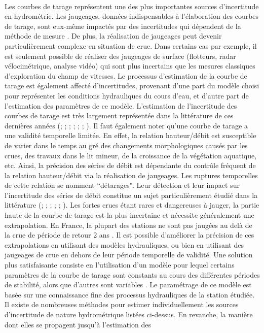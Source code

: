 \documentclass[11pt]{article}
\begin{document}
	\paragraph{} Les courbes de tarage représentent une des plus importantes sources d'incertitude en hydrométrie. Les jaugeages, données indispensables à l'élaboration des courbes de tarage, sont eux-même impactés par des incertitudes qui dépendent de la méthode de mesure \citep{lecoz_quantification_2014}. De plus, la réalisation de jaugeages peut devenir particulièrement complexe en situation de crue. Dans certains cas par exemple, il est seulement possible de réaliser des jaugeages de surface (flotteurs, radar vélocimétrique, analyse vidéo) qui sont plus incertains que les mesures classiques d'exploration du champ de vitesses. Le processus d'estimation de la courbe de tarage est également affecté d'incertitudes, provenant d'une part du modèle choisi pour représenter les conditions hydrauliques du cours d'eau, et d'autre part de l'estimation des paramètres de ce modèle. L'estimation de l'incertitude des courbes de tarage est très largement représentée dans la littérature de ces dernières années (\citet{petersen-overleir_bayesian_2009}; \citet{juston_rating_2014}; \citet{le_coz_combining_2014}; \citet{morlot_dynamic_2014}; \citet{coxon_novel_2015}; \citet{mcmillan_rating_2015}; \citet{mansanarez_rapid_2019}). Il faut également noter qu'une courbe de tarage a une validité temporelle limitée. En effet, la relation hauteur/débit est susceptible de varier dans le temps au gré des changements morphologiques causés par les crues, des travaux dans le lit mineur, de la croissance de la végétation aquatique, etc. Ainsi, la précision des séries de débit est dépendante du contrôle fréquent de la relation hauteur/débit via la réalisation de jaugeages. Les ruptures temporelles de cette relation se nomment ``détarages". Leur détection et leur impact sur l'incertitude des séries de débit constitue un sujet particulièrement étudié dans la littérature (\citet{mcmillan_impacts_2010}; \citet{westerberg_stage-discharge_2011}; \citet{guerrero_temporal_2012}; \citet{morlot_dynamic_2014}; \citet{lapuszek_methods_2015};  \citet{darienzo_detection_2021}). Les fortes crues étant rares et dangereuses à jauger, la partie haute de la courbe de tarage est la plus incertaine et nécessite généralement une extrapolation. En France, la plupart des stations ne sont pas jaugées au delà de la crue de période de retour 2 ans \citep{lang_extrapolation_2010}. Il est possible d'améliorer la précision de ces extrapolations en utilisant des modèles hydrauliques, ou bien en utilisant des jaugeages de crue en dehors de leur période temporelle de validité. Une solution plus satisfaisante consiste en l'utilisation d'un modèle pour lequel certains paramètres de la courbe de tarage sont constants au cours des différentes périodes de stabilité, alors que d'autres sont variables \citep{mansanarez_shift_2019}. Le paramétrage de ce modèle est basée sur une connaissance fine des processus hydrauliques de la station étudiée. Il existe de nombreuses méthodes pour estimer individuellement les sources d'incertitude de nature hydrométrique listées ci-dessus. En revanche, la manière dont elles se propagent jusqu'à l'estimation des 
\end{document}
